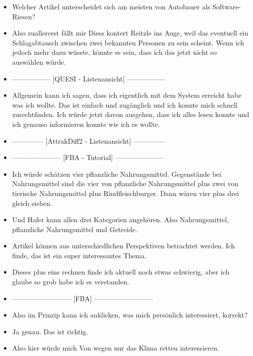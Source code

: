 {\begin{itemize}[]
            \item {} Welcher Artikel unterscheidet sich am meisten von \flqq Autobauer als Software-Riesen\frqq{}?
            \item {} Also zuallererst fällt mir Diess kontert Reitzle ins Auge, weil das eventuell ein Schlagabtausch zwischen zwei bekannten Personen zu sein scheint.
                  Wenn ich jedoch mehr dazu wüsste, könnte es sein, dass ich das jetzt nicht so auswählen würde.
            \item {-----------------} [QUESI - Listenansicht] {-----------------}
            \item {} Allgemein kann ich sagen, dass ich eigentlich mit dem System erreicht habe was ich wollte.
                  Das ist einfach und zugänglich und ich konnte mich schnell zurechtfinden.
                  Ich würde jetzt davon ausgehen, dass ich alles lesen konnte und ich genauso informieren konnte wie ich es wollte.
            \item {--------------} [AttrakDiff2 - Listenansicht] {--------------}
            \item {---------------------} [FBA - Tutorial] {---------------------}
            \item {} Ich würde schätzen vier pflanzliche Nahrungsmittel.
                  Gegenstände bei Nahrungsmittel sind die vier von pflanzliche Nahrungsmittel plus zwei von tierische Nahrungsmittel plus Rindfleischburger.
                  Dann wären vier plus drei gleich sieben.
            \item {} Und Hafer kann allen drei Kategorien angehören. Also Nahrungsmittel, pflanzliche Nahrungsmittel und Getreide.
            \item {} Artikel können aus unterschiedlichen Perspektiven betrachtet werden. Ich finde, das ist ein super interessantes Thema.
            \item {} Dieses plus eins rechnen finde ich aktuell noch etwas schwierig, aber ich glaube so grob habe ich es verstanden.
            \item {--------------------------} [FBA] {--------------------------}
            \item {} Also im Prinzip kann ich anklicken, was mich persönlich interessiert, korrekt?
            \item {} Ja genau. Das ist richtig.
            \item {} Also hier würde mich \flqq Von wegen nur das Klima retten\frqq{} interessieren.

\end{itemize}}
